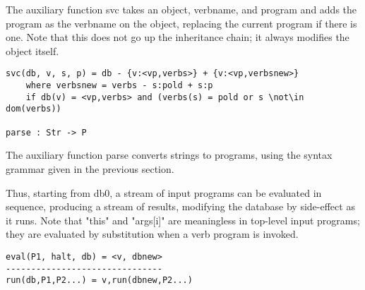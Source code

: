 \documentclass{article}
\begin{document}
The auxiliary function svc takes an object, verbname, and program and
adds the program as the verbname on the object, replacing the current
program if there is one.  Note that this does not go up the
inheritance chain; it always modifies the object itself.

\begin{verbatim}
svc(db, v, s, p) = db - {v:<vp,verbs>} + {v:<vp,verbsnew>}
    where verbsnew = verbs - s:pold + s:p
    if db(v) = <vp,verbs> and (verbs(s) = pold or s \not\in dom(verbs))

parse : Str -> P
\end{verbatim}

The auxiliary function parse converts strings to programs, using the
syntax grammar given in the previous section.


Thus, starting from db0, a stream of input programs can be evaluated
in sequence, producing a stream of results, modifying the database by
side-effect as it runs.  Note that "this" and "args[i]" are
meaningless in top-level input programs; they are evaluated by
substitution when a verb program is invoked.

\begin{verbatim}
eval(P1, halt, db) = <v, dbnew>
-------------------------------
run(db,P1,P2...) = v,run(dbnew,P2...)
\end{verbatim}



\end{document}

